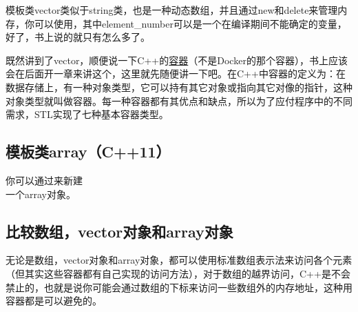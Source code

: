 模板类vector类似于string类，也是一种动态数组，并且通过new和delete来管理内存，你可以使用，其中element\_number可以是一个在编译期间不能确定的变量，好了，书上说的就只有怎么多了。\dpar

既然讲到了vector，顺便说一下C++的\href{https://zh.cppreference.com/w/cpp/container}{容器}（不是Docker的那个容器），书上应该会在后面开一章来讲这个，这里就先随便讲一下吧。在C++中容器的定义为：在数据存储上，有一种对象类型，它可以持有其它对象或指向其它对像的指针，这种对象类型就叫做容器。每一种容器都有其优点和缺点，所以为了应付程序中的不同需求，STL实现了七种基本容器类型。

\subsection{模板类array（C++11）}

你可以通过来新建\\ 一个array对象。

\subsection{比较数组，vector对象和array对象}

无论是数组，vector对象和array对象，都可以使用标准数组表示法来访问各个元素（但其实这些容器都有自己实现的访问方法），对于数组的越界访问，C++是不会禁止的，也就是说你可能会通过数组的下标来访问一些数组外的内存地址，这种用容器都是可以避免的。
